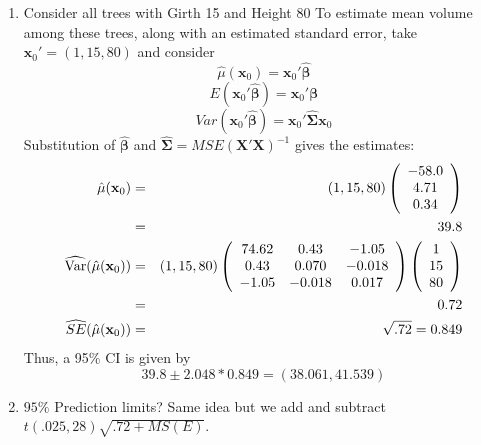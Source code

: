 \begin{enumerate}
\item Consider all trees with Girth 15 and Height 80 To estimate mean volume among these trees, along with an estimated standard error, take $\textbf{x}_0' = (1, 15, 80)$ and consider 
$$\hat\mu(\textbf{x}_0) = \textbf{x}_0'\hat{\boldsymbol{\beta}}$$
$$E(\textbf{x}_0'\hat{\boldsymbol{\beta}}) = \textbf{x}_0' \boldsymbol{\beta}$$
$$Var(\textbf{x}_0'\hat{\boldsymbol{\beta}}) = \textbf{x}_0' \hat{\boldsymbol{\Sigma}} \textbf{x}_0$$
Substitution of $\hat{\boldsymbol{\beta}}$ and $\hat{\boldsymbol{\Sigma}}=MSE(\textbf{X}'\textbf{X})^{-1}$ gives the estimates:
\begin{eqnarray*}
\hat\mu(\textbf{x}_0) &=& (1, 15, 80) \left(\begin{array}{c}-58.0 \\ 4.71 \\0.34\end{array}\right) \\
& = & 39.8 \\
\widehat{\mbox{Var}}(\hat\mu(\textbf{x}_0)) &=& (1, 15, 80)
\left( \begin{array}{ccc}
74.62      & 0.43      & -1.05 \\
0.43      & 0.070      & -0.018 \\
-1.05      & -0.018    &   0.017 \\
\end{array}\right) 
\left(\begin{array}{c}1 \\ 15 \\80 \end{array}\right) \\
& = & 0.72 \\
\widehat{SE}(\hat\mu(\textbf{x}_0)) &=& \sqrt{.72} = 0.849
\end{eqnarray*}
Thus, a 95\% CI is given by 
$$39.8 \pm 2.048*0.849=(38.061,41.539)$$
\item $95\%$ Prediction limits?  Same idea but we add and subtract $t(.025,28)\sqrt{.72 + MS(E)}$.
\end{enumerate}



